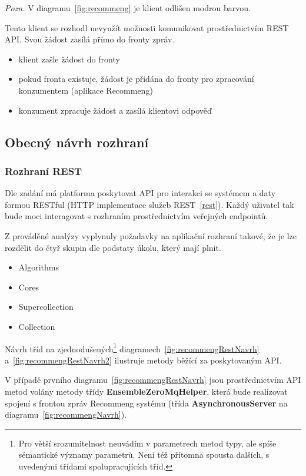 \documentclass[thesis=M,czech]{FITthesis}[2014/05/07]
\begin{document}
\emph{Pozn.} V diagramu~\ref{fig:recommeng} je klient odlišen modrou barvou.

Tento klient se rozhodl nevyužít možnosti komunikovat prostřednictvím REST API. Svou žádost zasílá přímo do fronty zpráv.

\begin{itemize}
	\item klient zašle žádost do fronty
	\item pokud fronta existuje, žádost je přidána do fronty pro zpracování konzumentem (aplikace Recommeng)
	\item konzument zpracuje žádost a zasílá klientovi odpověď
\end{itemize}

\subsection{Obecný návrh rozhraní}
\label{sec:recommeng}

\subsubsection{Rozhraní REST}
Dle zadání má platforma poskytovat API pro interakci se systémem a daty formou RESTful (HTTP implementace služeb REST~\ref{rest}). Každý uživatel tak bude moci interagovat s rozhraním prostřednictvím veřejných endpointů.

Z prováděné analýzy vyplynuly požadavky na aplikační rozhraní takové, že je lze rozdělit do čtyř skupin dle podstaty úkolu, který mají plnit. 

\begin{itemize}
	\item Algorithms
	\item Cores
	\item Supercollection
	\item Collection	
\end{itemize}

Návrh tříd na zjednodušených\footnote{Pro větší srozumitelnost neuvádím v parametrech metod typy, ale spíše sémantické významy parametrů. Není též přítomna spousta dalších, s uvedenými třídami spolupracujících tříd.} diagramech~\ref{fig:recommengRestNavrh} a~\ref{fig:recommengRestNavrh2} ilustruje metody běžící za poskytovaným API.

V případě prvního diagramu~\ref{fig:recommengRestNavrh} jsou prostřednictvím API metod volány metody třídy \textbf{EnsembleZeroMqHelper}, která bude realizovat spojení s frontou zpráv Recommeng systému (třída \textbf{AsynchronousServer} na diagramu~\ref{fig:recommengNavrh}).
\end{document}
